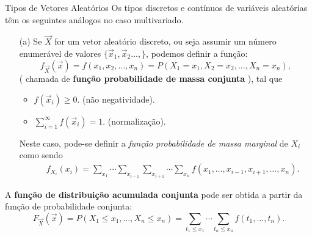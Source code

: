 \begin{frame}
\frametitle{}
\begin{block}{Tipos de Vetores Aleatórios}
Os tipos discretos e contínuos de variáveis aleatórias têm os seguintes análogos no caso multivariado.
\begin{enumerate}
\item[(a)] Se $\vec{X}$ for um vetor aleatório discreto, ou seja assumir um
número enumerável de valores $\{\vec{x}_1,\vec{x}_2\ldots,\}$, podemos definir a função:
\[
f_{\Vec{X}}(\Vec{x}) = f(x_1, x_2, \ldots, x_n) = P(X_1 = x_1, X_2 = x_2, \ldots, X_n = x_n),
\]
( chamada de \textbf{função probabilidade de massa conjunta} ),
tal que
\begin{itemize}
\item $f(\vec{x}_i)\geq 0$. (não negatividade).
\item $\sum_{i=1}^{\infty}f(\vec{x}_i)=1$. (normalização).
\end{itemize}
Neste caso, pode-se definir a {\em função probabilidade de massa marginal} de $X_i$ como sendo
\begin{eqnarray}
& & f_{X_i}(x_i)= \sum_{x_1}\cdots\sum_{x_{i-1}}\sum_{x_{i+1}}\cdots\sum_{x_n}f(x_1,\ldots,x_{i-1},x_{i+1},\ldots,x_n).\nonumber
\end{eqnarray}
\end{enumerate}
\end{block}
A \textbf{função de distribuição acumulada conjunta} pode ser obtida a partir da função de probabilidade conjunta:
\[
 F_{\vec{X}}(\vec{x}) = P(X_1 \leq x_1, \ldots, X_n \leq x_n) = \sum_{t_1 \leq x_1} \cdots \sum_{t_n \leq x_n} f(t_1, \ldots, t_n).
\]
\end{frame}


